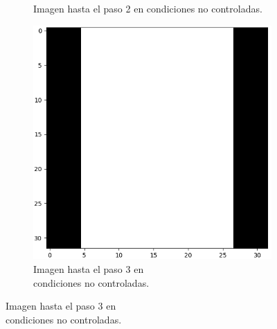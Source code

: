 \begin{figure}[hp!]
\begin{subfigure}[t]{0.3\textwidth}
        \caption{Imagen hasta el paso 2 en condiciones no controladas.}
    \end{subfigure}
    \hfill
    \begin{subfigure}[t]{0.3\textwidth}
        \centering
        \includegraphics[height=\x1cm]{3_Reconocimiento/Figs/test_sample6_bad_otsu2}
        \caption{Imagen hasta el paso 3 en \\ condiciones no controladas.}
    \end{subfigure}
\end{figure}

